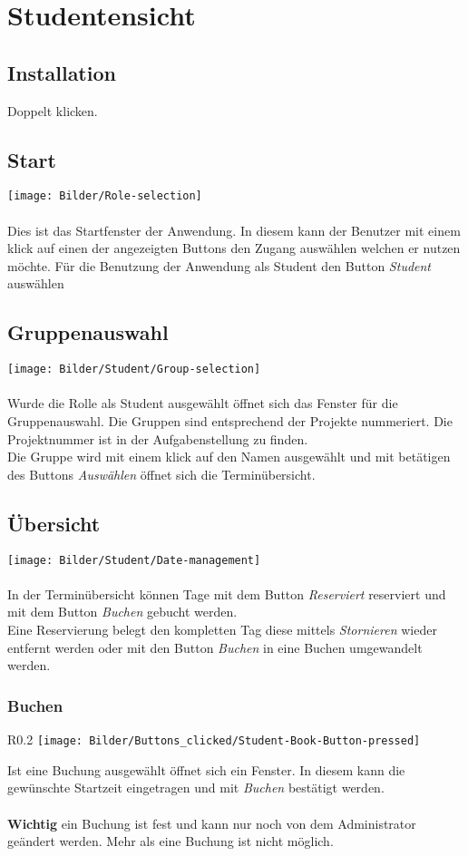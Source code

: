 \section{Studentensicht}

\subsection{Installation}
Doppelt klicken.

\subsection{Start}
\texttt{[image: Bilder/Role-selection]}
\\
\\
Dies ist das Startfenster der Anwendung. In diesem kann der Benutzer mit einem klick auf einen der angezeigten Buttons den Zugang auswählen welchen er nutzen möchte. Für die Benutzung der Anwendung als Student den Button \textit{Student} auswählen


\subsection{Gruppenauswahl}
\texttt{[image: Bilder/Student/Group-selection]}
\\
\\
Wurde die Rolle als Student ausgewählt öffnet sich das Fenster für die Gruppenauswahl. Die Gruppen sind entsprechend der Projekte nummeriert. Die Projektnummer ist in der Aufgabenstellung zu finden. 
\\
Die Gruppe wird mit einem klick auf den Namen ausgewählt und mit betätigen des Buttons \textit{Auswählen} öffnet sich die Terminübersicht.

\subsection{Übersicht}
\texttt{[image: Bilder/Student/Date-management]}
\\
\\
In der Terminübersicht können Tage mit dem Button \textit{Reserviert} reserviert und mit dem Button \textit{Buchen} gebucht werden. 
\\
Eine Reservierung belegt den kompletten Tag diese mittels \textit{Stornieren} wieder entfernt werden oder mit den Button \textit{Buchen} in eine Buchen umgewandelt werden.

 \subsubsection{Buchen}\begin{wrapfigure}{R}{0.2\textwidth}
 	\centering
 	\texttt{[image: Bilder/Buttons\_clicked/Student-Book-Button-pressed]}
 \end{wrapfigure}
 Ist eine Buchung ausgewählt öffnet sich ein Fenster. In diesem kann die gewünschte Startzeit eingetragen und mit \textit{Buchen} bestätigt werden. 
 \\
 \\
 \textbf{Wichtig} ein Buchung ist fest und kann nur noch von dem Administrator geändert werden. Mehr als eine Buchung ist nicht möglich. 